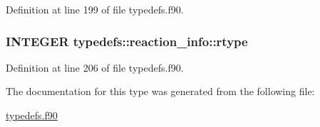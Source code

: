 Definition at line 199 of file typedefs.f90.\hypertarget{typetypedefs_1_1reaction__info_a3089ef7ea7760991f09190b030c6c1d1}{
\subsubsection[{rtype}]{\setlength{\rightskip}{0pt plus 5cm}INTEGER {\bf typedefs::reaction\_\-info::rtype}}}
\label{typetypedefs_1_1reaction__info_a3089ef7ea7760991f09190b030c6c1d1}


Definition at line 206 of file typedefs.f90.

The documentation for this type was generated from the following file:\begin{DoxyCompactItemize}
\item 
\hyperlink{typedefs_8f90}{typedefs.f90}\end{DoxyCompactItemize}
